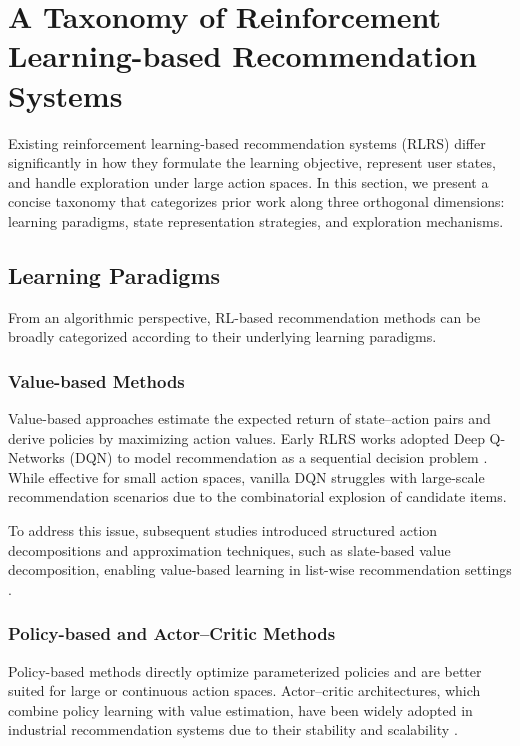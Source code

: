 \section{A Taxonomy of Reinforcement Learning-based Recommendation Systems}

Existing reinforcement learning-based recommendation systems (RLRS) differ significantly in how they formulate the learning objective, represent user states, and handle exploration under large action spaces. In this section, we present a concise taxonomy that categorizes prior work along three orthogonal dimensions: learning paradigms, state representation strategies, and exploration mechanisms.

\subsection{Learning Paradigms}

From an algorithmic perspective, RL-based recommendation methods can be broadly categorized according to their underlying learning paradigms.

\subsubsection{Value-based Methods}

Value-based approaches estimate the expected return of state--action pairs and derive policies by maximizing action values. Early RLRS works adopted Deep Q-Networks (DQN) to model recommendation as a sequential decision problem \cite{Mnih2015DQN}. While effective for small action spaces, vanilla DQN struggles with large-scale recommendation scenarios due to the combinatorial explosion of candidate items.

To address this issue, subsequent studies introduced structured action decompositions and approximation techniques, such as slate-based value decomposition, enabling value-based learning in list-wise recommendation settings \cite{Ie2019SlateQ}.

\subsubsection{Policy-based and Actor--Critic Methods}

Policy-based methods directly optimize parameterized policies and are better suited for large or continuous action spaces. Actor--critic architectures, which combine policy learning with value estimation, have been widely adopted in industrial recommendation systems due to their stability and scalability \cite{Lillicrap2016DDPG, Zhao2018SlateMDP}.

